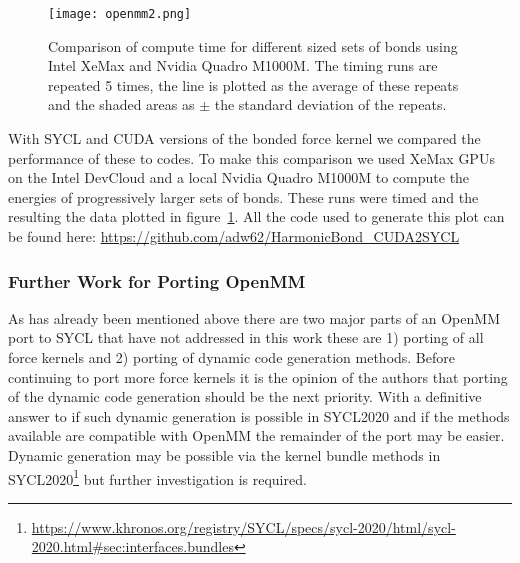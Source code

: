 \begin{figure}
	\caption{Comparison of compute time for different sized sets of bonds using Intel XeMax and Nvidia Quadro M1000M. The timing runs are repeated 5 times, the line is plotted as the average of these repeats and the shaded areas as $\pm$ the standard deviation of the repeats.}
	\texttt{[image: openmm2.png]}
	\label{fig:openmm}
\end{figure}

With SYCL and CUDA versions of the bonded force kernel we compared the performance of these to codes.
To make this comparison we used XeMax GPUs on the Intel DevCloud and a local Nvidia Quadro M1000M to compute the energies of progressively larger sets of bonds.
These runs were timed and the resulting the data plotted in figure~\ref{fig:openmm}.
All the code used to generate this plot can be found here: \url{https://github.com/adw62/HarmonicBond_CUDA2SYCL}

\subsubsection{Further Work for Porting OpenMM}\label{sec:openmm_furtherwork}

As has already been mentioned above there are two major parts of an OpenMM port to SYCL that have not addressed in this work these are 1) porting of all force kernels and 2) porting of dynamic code generation methods.
Before continuing to port more force kernels it is the opinion of the authors that porting of the dynamic code generation should be the next priority.
With a definitive answer to if such dynamic generation is possible in SYCL2020 and if the methods available are compatible with OpenMM the remainder of the port may be easier.
Dynamic generation may be possible via the kernel bundle methods in SYCL2020\footnote{\url{https://www.khronos.org/registry/SYCL/specs/sycl-2020/html/sycl-2020.html\#sec:interfaces.bundles}} but further investigation is required.
